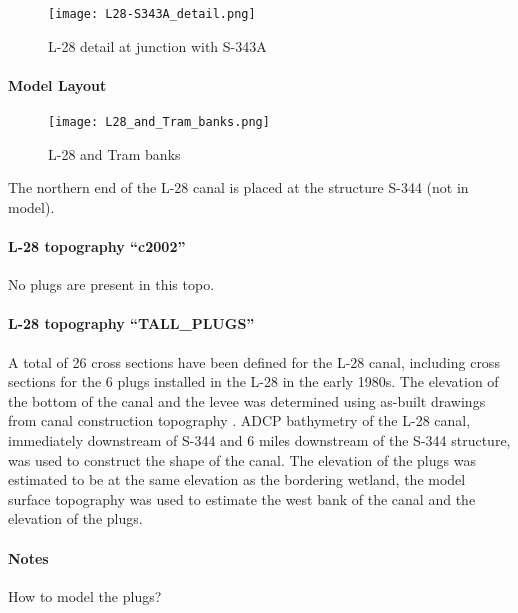 \begin{figure}[!h]
  \begin{center}
  \texttt{[image: L28-S343A\_detail.png]}
  \caption{L-28 detail at junction with S-343A}
  \end{center}
\end{figure}

\paragraph{Model Layout}

\begin{figure}[!h]
  \begin{center}
  \texttt{[image: L28\_and\_Tram\_banks.png]}
  \caption{L-28 and Tram banks}
  \end{center}
\end{figure}

The northern end of the L-28 canal is placed at the structure S-344 (not in model).

\paragraph{L-28 topography ``c2002''}
No plugs are present in this topo.

\paragraph{L-28 topography ``TALL\_PLUGS''}
A total of 26 cross sections have been defined for the L-28 canal, including cross sections for the 6 plugs installed in the L-28 in the early 1980s.  The elevation of the bottom of the canal and the levee was determined using as-built drawings from canal construction topography \citep{L28topo}.  ADCP bathymetry of the L-28 canal, immediately downstream of S-344 and 6 miles downstream of the S-344 structure, was used to construct the shape of the canal.  The elevation of the plugs was estimated to be at the same elevation as the bordering wetland, the model surface topography was used to estimate the west bank of the canal and the elevation of the plugs.

\begin{notes}
\paragraph{Notes}
How to model the plugs?
\end{notes}


